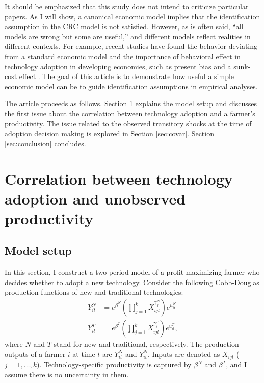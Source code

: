 \documentclass[11pt,letterpaper]{article}
\begin{document}
It should be emphasized that this study does not intend to criticize particular papers.
As I will show, a canonical economic model implies that the identification assumption in the CRC model is not satisfied.
However, as is often said, ``all models are wrong but some are useful,'' and different models reflect realities in different contexts.
For example, recent studies have found the behavior deviating from a standard economic model and the importance of behavioral effect in technology adoption in developing economies, such as present bias \citep{duflo2011nudging} and a sunk-cost effect \citep{ashraf2010can}.
The goal of this article is to demonstrate how useful a simple economic model can be to guide identification assumptions in empirical analyses.

The article proceeds as follows.
Section \ref{sec:tau} explains the model setup and discusses the first issue about the correlation between technology adoption and a farmer's productivity.
The issue related to the observed transitory shocks at the time of adoption decision making is explored in Section \ref{sec:covar}.
Section \ref{sec:conclusion} concludes.

\section{Correlation between technology adoption and unobserved productivity}\label{sec:tau}
\subsection{Model setup}

In this section, I construct a two-period model of a profit-maximizing farmer who decides whether to adopt a new technology.
Consider the following Cobb-Douglas production functions of new and traditional technologies:
\begin{align*}
  Y_{it}^N &= e^{\beta^N} \left(\prod_{j=1}^k X_{ijt}^{\gamma_j^N} \right) e^{u_{it}^N} \\
  Y_{it}^T &= e^{\beta^T} \left(\prod_{j=1}^k X_{ijt}^{\gamma_j^T} \right) e^{u_{it}^T},
\end{align*}
where $N$ and $T$ stand for new and traditional, respectively.
The production outputs of a farmer $i$ at time $t$ are $Y_{it}^N$ and $Y_{it}^N$.
Inputs are denoted as $X_{ijt}$ ($j = 1, \dots, k$).
Technology-specific productivity is captured by $\beta^N$ and $\beta^T$, and I assume there is no uncertainty in them.
\end{document}
